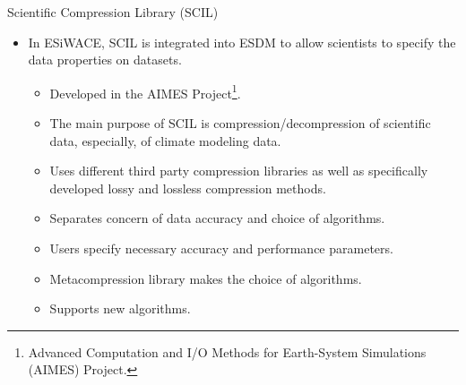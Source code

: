 \documentclass[compress,11pt,xcolor=svgnames,aspectratio=169]{beamer}
\begin{document}
\begin{frame}[fragile]{Scientific Compression Library (SCIL)}

\begin{itemize}
\setlength\itemsep{0.2cm}
    \item In ESiWACE, SCIL is integrated into ESDM to allow scientists to specify the data properties on datasets.

    \begin{itemize}
    \setlength\itemsep{0.2cm}
        \item Developed in the AIMES Project\footnote{Advanced Computation and I/O Methods for Earth-System Simulations (AIMES) Project.}.
        \item The main purpose of SCIL is compression/decompression of scientific data, especially, of climate modeling data.
        \item Uses different third party compression libraries as well as specifically developed lossy and lossless compression methods.
        \item Separates concern of data accuracy and choice of algorithms.
        \item Users specify necessary accuracy and performance parameters.
        \item Metacompression library makes the choice of algorithms.
        \item Supports new algorithms.
    \end{itemize}

\end{itemize}

\end{frame}
\end{document}
